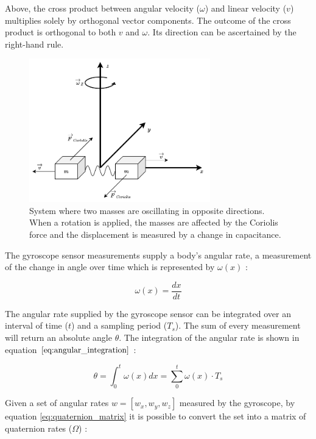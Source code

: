Above, the cross product between angular velocity ($\omega$) and linear velocity ($v$) multiplies solely by orthogonal vector components. The outcome of the cross product is orthogonal to both $v$ and $\omega$. Its direction can be ascertained by the right-hand rule.

\begin{figure}[!h]
    \centering
    \includegraphics[width=0.7\textwidth]{figures/coriolis.pdf}
    \caption{ System where two masses are oscillating in opposite directions. When a rotation is applied, the masses are affected by the Coriolis force and the displacement is measured by a change in capacitance. \cite{passaro2017gyroscope}}
    \label{fig:coriolis}
\end{figure}

The gyroscope sensor measurements supply a body's angular rate, a measurement of the change in angle over time which is represented by $\omega(x)$ \cite{trusov2011overview}:

\begin{equation}
    \omega(x) = \frac{dx}{dt}
\end{equation}

The angular rate supplied by the gyroscope sensor can be integrated over an interval of time ($t$) and a sampling period ($T_s$). The sum of every measurement will return an absolute angle $\theta$. The integration of the angular rate is shown in equation $\ref{eq:angular_integration}$ \cite{trusov2011overview}:

\begin{equation}
    \theta = \int_{0}^{t} \omega(x) dx = \sum_{0}^{t} \omega(x)\cdot T_s
    \label{eq:angular_integration}
\end{equation}

Given a set of angular rates $w=[w_x,w_y,w_z]$ measured by the gyroscope, by equation \ref{eq:quaternion_matrix} it is possible to convert the set into a matrix of quaternion rates ($\Omega$) \cite{trusov2011overview}:


